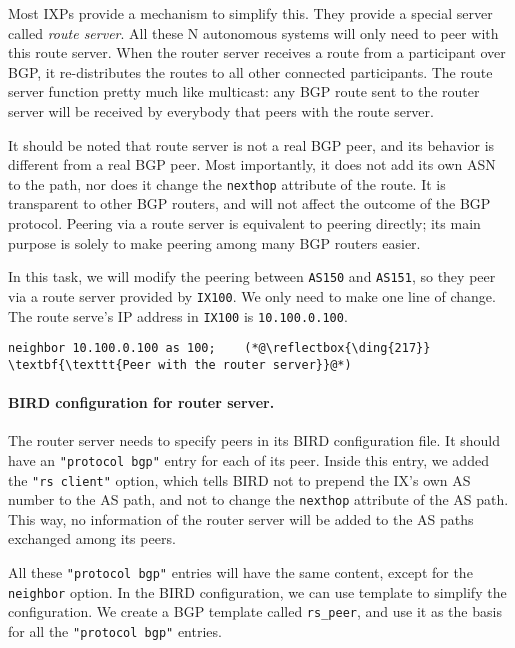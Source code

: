 Most IXPs provide a mechanism to simplify this. They 
provide a special server called \textit{route server}.  
All these N autonomous systems will only need to peer with
this route server. 
When the router server receives a route from a participant over BGP, it 
re-distributes the routes to all other connected participants. 
The route server function pretty much like multicast: 
any BGP route sent to the router server will
be received by everybody that peers with the route server. 

It should be noted that route server is not a real BGP peer, and 
its behavior is different from a real BGP peer. Most importantly, 
it does not add its own ASN to the path, nor does it change 
the \texttt{nexthop} attribute of the route. It is 
transparent to other BGP routers, and will not affect the outcome of the BGP protocol. 
Peering via a route server is equivalent to peering directly; 
its main purpose is solely to make peering among many BGP routers
easier.  


In this task, we will modify the peering between \texttt{AS150} 
and \texttt{AS151}, so they peer via a route server provided by \texttt{IX100}.  
We only need to make one line of change. 
The route serve's IP address in \texttt{IX100} is \texttt{10.100.0.100}.  

\begin{lstlisting}
neighbor 10.100.0.100 as 100;    (*@\reflectbox{\ding{217}} \textbf{\texttt{Peer with the router server}}@*) 
\end{lstlisting}

\paragraph{BIRD configuration for router server.} 
The router server needs to specify peers in its BIRD configuration
file. It should have an \texttt{"protocol bgp"} entry
for each of its peer. 
Inside this entry, we added the \texttt{"rs client"} option, 
which tells BIRD not to
prepend the IX's own AS number to the AS path, and not to change the 
\texttt{nexthop} attribute of the AS path. This way,
no information of the router server will be added to the AS paths
exchanged among its peers. 

All these \texttt{"protocol bgp"} entries will have the same content, except 
for the \texttt{neighbor} option. In the BIRD configuration,
we can use template to simplify the configuration. 
We create a BGP template called \texttt{rs\_peer},
and use it as the basis for all the \texttt{"protocol bgp"} entries. 


